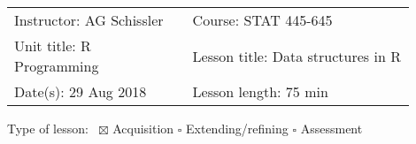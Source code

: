 \documentclass[letterpaper,11pt]{article}
\newcommand\textlcsc[1]{\textsc{\MakeLowercase{#1}}}
\begin{document}

\vspace{5mm}

\begin{tabular}{p{0.4\linewidth} p{0.5\linewidth}}
  Instructor: AG Schissler & Course: STAT 445-645 \\
  Unit title: R Programming & Lesson title: Data structures in R \\
  Date(s): 29 Aug 2018 & Lesson length: 75 min \\
\end{tabular}

\vspace{5mm}
Type of lesson:~ $\boxtimes$ Acquisition \hspace{5mm} $\square$ Extending/refining  \hspace{5mm} $\square$ Assessment

\vspace{5mm}
\end{document}
